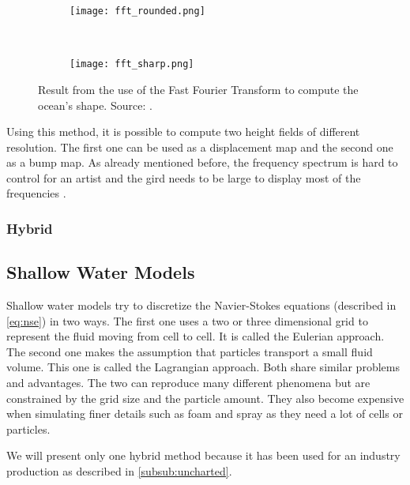 \begin{figure}[h!]
    \centering
    \begin{subfigure}[h]{0.45\textwidth}
        \centering
        \texttt{[image: fft\_rounded.png]}
        \label{subfig:fft_round}
    \end{subfigure}~%
    \begin{subfigure}[h]{0.45\textwidth}
        \centering
        \texttt{[image: fft\_sharp.png]}
        \label{subfig:fft_sharp}
    \end{subfigure}
    \caption{Result from the use of the Fast Fourier Transform to compute the
    ocean's shape. Source:
    \autocite{tessendorf2001simulating}.}\label{fig:fft_comparison}
\end{figure}

Using this method, it is possible to compute two height fields of different
resolution. The first one can be used as a displacement map and the second one
as a bump map. As already mentioned before, the frequency spectrum is hard to
control for an artist and the gird needs to be large to display most of the
frequencies \autocite{gonzalez2016rendering}.


\subsubsection{Hybrid}

\subsection{Shallow Water Models}\label{subsec:shallow_water}

Shallow water models try to discretize the Navier-Stokes equations (described
in \autoref{eq:nse}) in two ways. The first one uses a two or three dimensional
grid to represent the fluid moving from cell to cell. It is called the Eulerian
approach. The second one makes the assumption that particles transport a small
fluid volume. This one is called the Lagrangian approach. Both share similar
problems and advantages. The two can reproduce many different phenomena but are
constrained by the grid size and the particle amount. They also become expensive
when simulating finer details such as foam and spray as they need a lot of cells
or particles.

We will present only one hybrid method because it has been used for an industry
production as described in \autoref{subsub:uncharted}.

